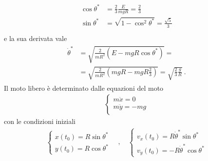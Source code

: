 \documentclass[letterpaper,10pt,italian]{jupyterBook}
\begin{document}
\begin{enumerate}
\begin{equation*}
\begin{split}\begin{aligned}
      \cos \theta^* & = \frac{2}{3} \frac{E}{mgR} = \frac{2}{3} \\
      \sin \theta^* & = \sqrt{1 - \cos^2 \theta^* } = \frac{\sqrt{5}}{3} \\
    \end{aligned}\end{split}
\end{equation*}
\sphinxAtStartPar
e la sua derivata vale
\begin{equation*}
\begin{split}\begin{aligned}
      \dot{\theta}^*
      & = \sqrt{ \frac{2}{m R^2} \left( E - m g R \cos \theta^* \right) } = \\
      & = \sqrt{ \frac{2}{m R^2} \left( m g R - m g R \frac{2}{3} \right) } 
        = \sqrt{ \frac{2}{3} \frac{g}{R} } \ .
    \end{aligned}\end{split}
\end{equation*}
\sphinxAtStartPar
Il moto libero è determinato dalle equazioni del moto
\begin{equation*}
\begin{split}\begin{cases}
      m \ddot{x} = 0 \\
      m \ddot{y} = -m g \\
    \end{cases}\end{split}
\end{equation*}
\sphinxAtStartPar
con le condizioni iniziali
\begin{equation*}
\begin{split}
    \begin{cases} x(t_0) = R \sin \theta^* \\ y(t_0) = R \cos \theta^* \end{cases} 
    \quad , \quad 
    \begin{cases} v_x(t_0) = R \dot{\theta}^* \sin \theta^* \\ v_y(t_0) = - R \dot{\theta}^* \cos \theta^* \end{cases}
    \end{split}
\end{equation*}
\end{enumerate}
\end{document}
